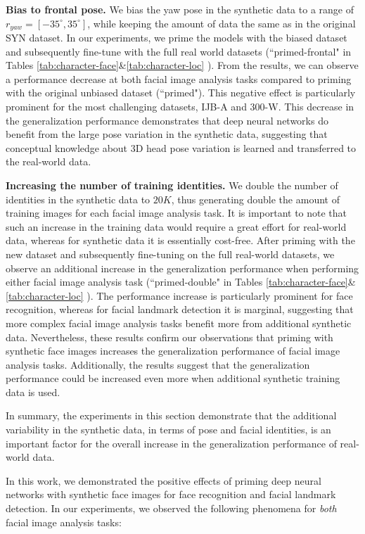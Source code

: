 \documentclass[10pt,twocolumn,letterpaper]{article}
\begin{document}
    \textbf{Bias to frontal pose.} We bias the yaw pose in the synthetic data to a range of $r_{yaw}=[ -35^\circ,35^\circ ]$, while keeping the amount of data the same as in the original SYN dataset. In our experiments, we prime the models with the biased dataset and subsequently fine-tune with the full real world datasets (``primed-frontal" in Tables \ref{tab:character-face}\&\ref{tab:character-loc} ). From the results, we can observe a performance decrease at both facial image analysis tasks compared to priming with the original unbiased dataset (``primed"). This negative effect is particularly prominent for the most challenging datasets, IJB-A and 300-W. This decrease in the generalization performance demonstrates that deep neural networks do benefit from the large pose variation in the synthetic data, suggesting that conceptual knowledge about 3D head pose variation is learned and transferred to the real-world data. 

\textbf{Increasing the number of training identities.} We double the number of identities in the synthetic data to $20K$, thus generating double the amount of training images for each facial image analysis task. It is important to note that such an increase in the training data would require a great effort for real-world data, whereas for synthetic data it is essentially cost-free. After priming with the new dataset and subsequently fine-tuning on the full real-world datasets, we observe an additional increase in the generalization performance when performing either facial image analysis task (``primed-double" in Tables \ref{tab:character-face}\&\ref{tab:character-loc} ). The performance increase is particularly prominent for face recognition, whereas for facial landmark detection it is marginal, suggesting that more complex facial image analysis tasks benefit more from additional synthetic data. Nevertheless, these results confirm our observations that priming with synthetic face images increases the generalization performance of facial image analysis tasks. Additionally, the results suggest that the generalization performance could be increased even more when additional synthetic training data is used.
    
    In summary, the experiments in this section demonstrate that the additional variability in the synthetic data, in terms of pose and facial identities, is an important factor for the overall increase in the generalization performance of real-world data.
    
	


	In this work, we demonstrated the positive effects of priming deep neural networks with synthetic face images for face recognition and facial landmark detection. In our experiments, we observed the following phenomena for \textit{both} facial image analysis tasks:
	
\end{document}
